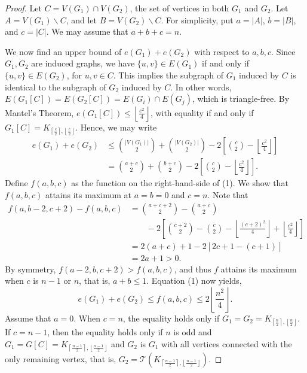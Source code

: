 \documentclass[12pt]{report}
\begin{document}
\begin{proof}
  Let $C = V(G_1) \cap V(G_2)$, the set of vertices in both $G_1$ and $G_2$. Let $A = V(G_1)
  \backslash C$, and let $B = V(G_2) \backslash C$. For simplicity, put $a = |A|$, $b = |B|$, and $c
  = |C|$. We may assume that $a + b + c = n$.

  We now find an upper bound of $e(G_1) + e(G_2)$ with respect to $a, b, c$. Since $G_1, G_2$ are
  induced graphs, we have $\{u, v\} \in E(G_1)$ if and only if $\{u, v\} \in E(G_2)$, for $u, v \in
  C$. This implies the subgraph of $G_1$ induced by $C$ is identical to the subgraph of $G_2$
  induced by $C$. In other words, $E(G_1[C]) = E(G_2[C]) = E(G_i) \cap E(G_j)$, which is
  triangle-free. By Mantel's Theorem, $e(G_1[C]) \leq \left\lfloor\frac{c^2}{4}\right\rfloor$, with
  equality if and only if $G_1[C] = K_{\left\lceil\frac{c}{2}\right\rceil,
  \left\lfloor\frac{c}{2}\right\rfloor}$. Hence, we may write
  \begin{align}
    e(G_1) + e(G_2) 
    &\leq \binom{|V(G_1)|}{2} + \binom{|V(G_2)|}{2} - 2\left[\binom{c}{2} - \left\lfloor\frac{c^2}{4}\right\rfloor\right] \nonumber \\
    &= \binom{a + c}{2} + \binom{b + c}{2} - 2\left[\binom{c}{2} - \left\lfloor\frac{c^2}{4}\right\rfloor\right].
  \end{align}
  Define $f(a, b, c)$ as the function on the right-hand-side of (1). We show that $f(a, b, c)$
  attains its maximum at $a = b = 0$ and $c = n$. Note that
  \begin{align*}
    f(a, b - 2, c + 2) - f(a, b, c)
    &= \binom{a + c + 2}{2} - \binom{a + c}{2} \\
    &\qquad - 2\left[\binom{c + 2}{2} - \binom{c}{2} - \left\lfloor\frac{(c + 2)^2}{4}\right\rfloor + \left\lfloor\frac{c^2}{4}\right\rfloor\right] \\
    &= 2(a + c) + 1 - 2[2c + 1 - (c + 1)] \\
    &= 2a + 1 > 0.
  \end{align*}
  By symmetry, $f(a - 2, b, c + 2) > f(a, b, c)$, and thus $f$ attains its maximum when $c$ is $n -
  1$ or $n$, that is, $a + b \leq 1$. Equation (1) now yields, 
  \[
    e(G_1) + e(G_2) \leq f(a, b, c) \leq 2\left\lfloor\frac{n^2}{4}\right\rfloor.
  \]
  Assume that $a = 0$. When $c = n$, the equality holds only if $G_1 = G_2 =
  K_{\left\lceil\frac{n}{2}\right\rceil, \left\lfloor\frac{n}{2}\right\rfloor}$. If $c = n - 1$,
  then the equality holds only if $n$ is odd and $G_1 = G[C] = K_{\left\lceil\frac{n -
  1}{2}\right\rceil, \left\lfloor\frac{n - 1}{2}\right\rfloor}$ and $G_2$ is $G_1$ with all vertices
  connected with the only remaining vertex, that is, $G_2 = \mathcal{T}(K_{\left\lceil\frac{n -
  1}{2}\right\rceil, \left\lfloor\frac{n - 1}{2}\right\rfloor})$.
\end{proof}
\end{document}
